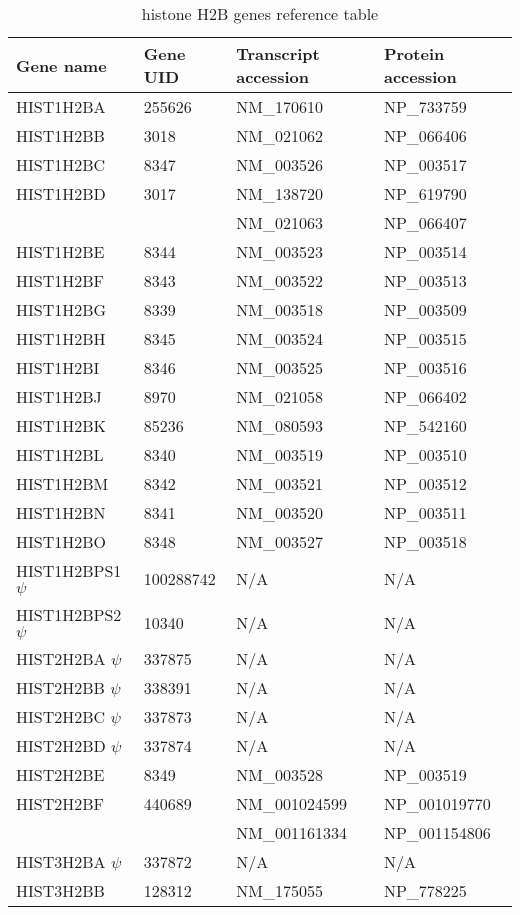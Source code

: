\begin{table}
  \centering
  \begin{tabular}{l | l | l | l }
    Gene name & Gene UID & Transcript accession & Protein accession \\
    \hline
     HIST1H2BA & 255626 & NM\_170610 & NP\_733759 \\
     HIST1H2BB & 3018 & NM\_021062 & NP\_066406 \\
     HIST1H2BC & 8347 & NM\_003526 & NP\_003517 \\
     HIST1H2BD & 3017 & NM\_138720 & NP\_619790 \\
     \null     & \null & NM\_021063 & NP\_066407 \\
     HIST1H2BE & 8344 & NM\_003523 & NP\_003514 \\
     HIST1H2BF & 8343 & NM\_003522 & NP\_003513 \\
     HIST1H2BG & 8339 & NM\_003518 & NP\_003509 \\
     HIST1H2BH & 8345 & NM\_003524 & NP\_003515 \\
     HIST1H2BI & 8346 & NM\_003525 & NP\_003516 \\
     HIST1H2BJ & 8970 & NM\_021058 & NP\_066402 \\
     HIST1H2BK & 85236 & NM\_080593 & NP\_542160 \\
     HIST1H2BL & 8340 & NM\_003519 & NP\_003510 \\
     HIST1H2BM & 8342 & NM\_003521 & NP\_003512 \\
     HIST1H2BN & 8341 & NM\_003520 & NP\_003511 \\
     HIST1H2BO & 8348 & NM\_003527 & NP\_003518 \\
     HIST1H2BPS1 $\psi$ & 100288742 & N/A & N/A \\
     HIST1H2BPS2 $\psi$ & 10340 & N/A & N/A \\
     HIST2H2BA $\psi$ & 337875 & N/A & N/A \\
     HIST2H2BB $\psi$ & 338391 & N/A & N/A \\
     HIST2H2BC $\psi$ & 337873 & N/A & N/A \\
     HIST2H2BD $\psi$ & 337874 & N/A & N/A \\
     HIST2H2BE & 8349 & NM\_003528 & NP\_003519 \\
     HIST2H2BF & 440689 & NM\_001024599 & NP\_001019770 \\
     \null     & \null  & NM\_001161334 & NP\_001154806 \\
     HIST3H2BA $\psi$ & 337872 & N/A & N/A \\
     HIST3H2BB & 128312 & NM\_175055 & NP\_778225 \\
  \end{tabular}
  \caption{histone H2B genes reference table}
  \label{tab:h2b-ref}
\end{table}
